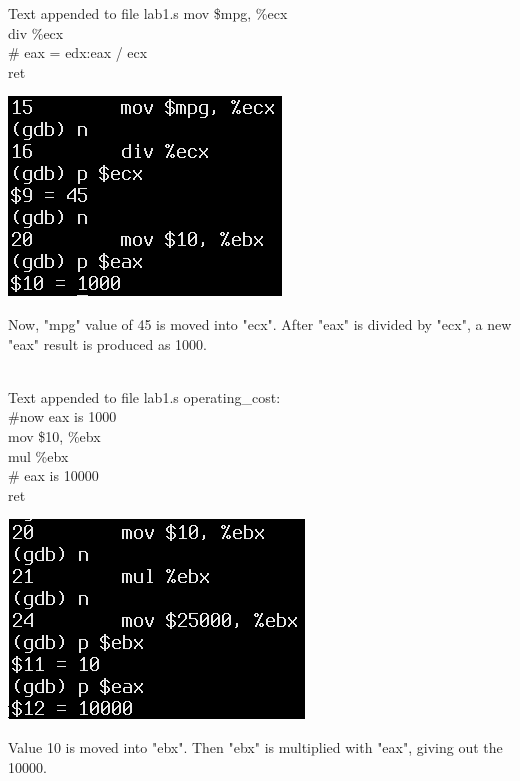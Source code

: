 \documentclass{article}
\begin{document}
\begin{multicols}{2}
\begin{GFT}{Text appended to file lab1.s}
\+  mov \$mpg, \%ecx\\
\+  div \%ecx \\
\+  \# eax = edx:eax / ecx\\
\+  ret\\
\end{GFT}
\columnbreak
\raggedleft
\includegraphics[scale=0.4]{afc2asm.png}
\end{multicols}
Now, "mpg" value of 45 is moved into "ecx". After "eax" is divided by "ecx", a new "eax" result is produced as 1000. \\ 
\noindent{\color{red}\rule{\linewidth}{0.5mm}} \\
\clearpage

\begin{multicols}{2}
\begin{GFT}{Text appended to file lab1.s}
\+  operating\_cost:\\
\+  \#now eax is 1000\\
\+  mov \$10, \%ebx\\
\+  mul \%ebx \\
\+  \# eax is 10000\\
\+  ret\\
\end{GFT}
\columnbreak
\raggedleft
\includegraphics[scale=0.4]{opasm.png}
\end{multicols}
Value 10 is moved into "ebx". Then "ebx" is multiplied with "eax", giving out the 10000. \\
\noindent{\color{red}\rule{\linewidth}{0.5mm}} \\
\end{document}
